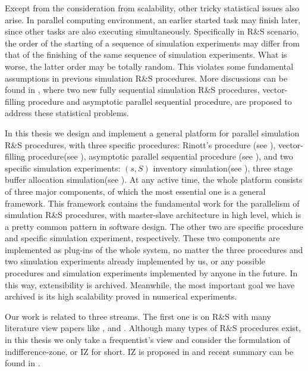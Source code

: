 Except from the consideration from scalability, other tricky statistical issues also arise. In parallel computing environment, an earlier started task may finish later, since other tasks are also executing simultaneously. Specifically in R\&S scenario, the order of the starting of a sequence of simulation experiments may differ from that of the finishing of the same sequence of simulation experiments. What is worse, the latter order may be totally random. This violates some fundamental assumptions in previous simulation R\&S procedures. More discussions can be found in \cite{ras-seq-parallel}, where two new fully sequential simulation R\&S procedures, vector-filling procedure and asymptotic parallel sequential procedure, are proposed to address these statistical problems.

In this thesis we design and implement a general platform for parallel simulation R\&S procedures, with three specific procedures: Rinott's procedure (see \cite{cistam1978rinott}), vector-filling procedure(see \cite{ras-seq-parallel}), asymptotic parallel sequential procedure (see \cite{ras-seq-parallel}), and two specific simulation experiments: $(s, S)$ inventory simulation(see \cite{cissac1985ss}), three stage buffer allocation simulation(see \cite{smoms93threestage}). At any active time, the whole platform consists of three major components, of which the most essential one is a general framework. This framework contains the fundamental work for the parallelism of simulation R\&S procedures, with master-slave architecture in high level, which is a pretty common pattern in software design. The other two are specific procedure and specific simulation experiment, respectively. These two components are implemented as plug-ins of the whole system, no matter the three procedures and two simulation experiments already implemented by us, or any possible procedures and simulation experiments implemented by anyone in the future. In this way, extensibility is archived. Meanwhile, the most important goal we have archived is its high scalability proved in numerical experiments.

Our work is related to three streams. The first one is on R\&S with many literature view papers like \cite{ras-recent-advances}, \cite{ehiorams06ras} and \cite{ms05ras}. Although many types of R\&S procedures exist, in this thesis we only take a frequentist’s view and consider the formulation of indifference-zone, or IZ for short. IZ is proposed in \cite{toams1954iz} and recent summary can be found in \cite{nyjws95iz}.

